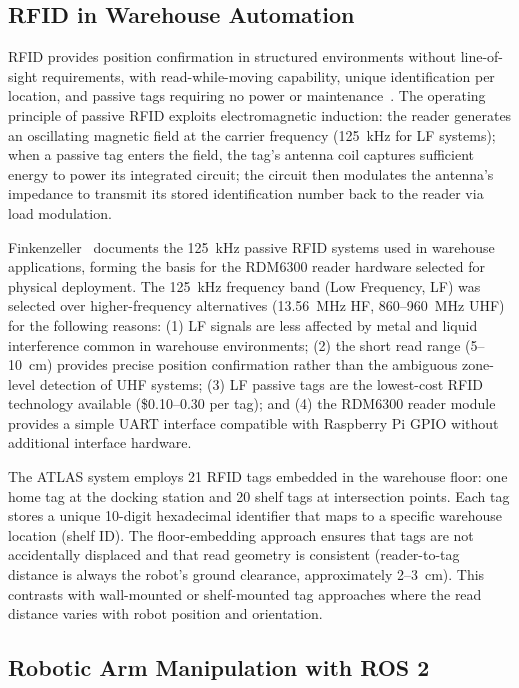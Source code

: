 \documentclass[12pt,a4paper,oneside]{report}
\begin{document}
\subsection{RFID in Warehouse Automation}

RFID provides position confirmation in structured environments without line-of-sight requirements, with read-while-moving capability, unique identification per location, and passive tags requiring no power or maintenance~\cite{finkenzeller2010}. The operating principle of passive RFID exploits electromagnetic induction: the reader generates an oscillating magnetic field at the carrier frequency (125~kHz for LF systems); when a passive tag enters the field, the tag's antenna coil captures sufficient energy to power its integrated circuit; the circuit then modulates the antenna's impedance to transmit its stored identification number back to the reader via load modulation.

Finkenzeller~\cite{finkenzeller2010} documents the 125~kHz passive RFID systems used in warehouse applications, forming the basis for the RDM6300 reader hardware selected for physical deployment. The 125~kHz frequency band (Low Frequency, LF) was selected over higher-frequency alternatives (13.56~MHz HF, 860--960~MHz UHF) for the following reasons: (1) LF signals are less affected by metal and liquid interference common in warehouse environments; (2) the short read range (5--10~cm) provides precise position confirmation rather than the ambiguous zone-level detection of UHF systems; (3) LF passive tags are the lowest-cost RFID technology available (\$0.10--0.30 per tag); and (4) the RDM6300 reader module provides a simple UART interface compatible with Raspberry Pi GPIO without additional interface hardware.

The ATLAS system employs 21 RFID tags embedded in the warehouse floor: one home tag at the docking station and 20 shelf tags at intersection points. Each tag stores a unique 10-digit hexadecimal identifier that maps to a specific warehouse location (shelf ID). The floor-embedding approach ensures that tags are not accidentally displaced and that read geometry is consistent (reader-to-tag distance is always the robot's ground clearance, approximately 2--3~cm). This contrasts with wall-mounted or shelf-mounted tag approaches where the read distance varies with robot position and orientation.

\subsection{Robotic Arm Manipulation with ROS 2}
\end{document}

